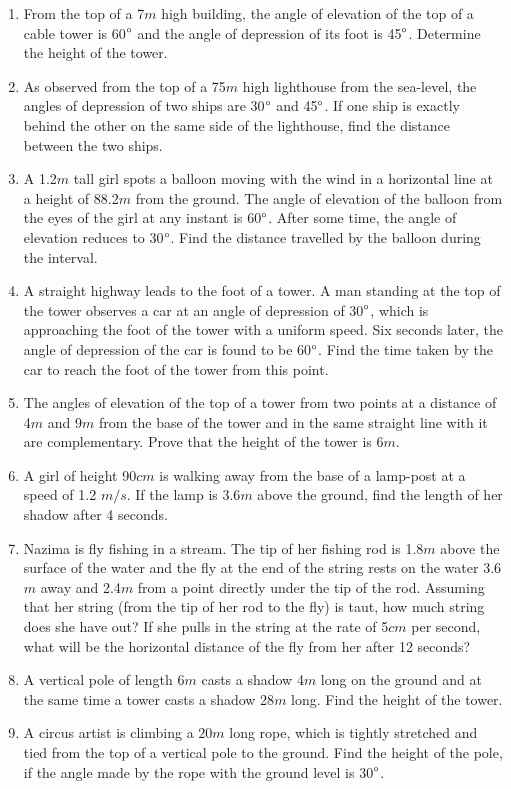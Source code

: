 \begin{enumerate}[label=\thesubsection.\arabic*.,ref=\thesubsection.\theenumi]
\item From the top of a 7$m$ high building, the angle of elevation of the top of a cable tower is 60$\degree$ and the angle of depression of its foot is 45$\degree$. Determine the height of the tower.
\item As observed from the top of a 75$m$ high lighthouse from the sea-level, the angles of depression of two ships are 30$\degree$ and 45$\degree$. If one ship is exactly behind the other on the same side of the lighthouse, find the distance between the two ships.
\item A 1.2$m$ tall girl spots a balloon moving with the wind in a horizontal line at a height of 88.2$m$ from the ground. The angle of elevation of the balloon from the eyes of the girl at any instant is 60$\degree$. After some time, the angle of elevation reduces to 30$\degree$. Find the distance travelled by the balloon during the interval.
\item A straight highway leads to the foot of a tower. A man standing at the top of the tower observes a car at an angle of depression of 30$\degree$, which is approaching the foot of the tower with a uniform speed. Six seconds later, the angle of depression of the car is found to be 60$\degree$. Find the time taken by the car to reach the foot of the tower from this point.
\item The angles of elevation of the top of a tower from two points at a distance of 4$m$ and 9$m$ from the base of the tower and in the same straight line with it are complementary. Prove that the height of the tower is $6m$.
\item A girl of height 90$cm$ is walking away from the base of a lamp-post at a speed of 1.2 $m/s$. If the lamp is 3.6$m$ above the ground, find the length of her shadow after 4 seconds.
\item  Nazima is fly fishing in a stream. The tip of her fishing rod is 1.8$m$ above the surface of the water and the fly at the end of the string rests on the water 3.6$m$ away and 2.4$m$ from a point directly under the tip of the rod. Assuming that her string (from the tip of her rod to the fly) is taut, how much string does she have out? If she pulls in the string at the rate of 5$cm$ per second, what will be the horizontal distance of the fly from her after 12 seconds?
%
\item  A vertical pole of length 6$m$ casts a shadow 4$m$ long on the ground and at the same time a tower casts a shadow 28$m$ long. Find the height of the tower.
\item A circus artist is climbing a $20m$ long rope, which is tightly stretched and tied from the top of a vertical pole to the ground.  Find the height of the pole, if the angle made by the rope with the ground level is 30$\degree$.

\end{enumerate}
